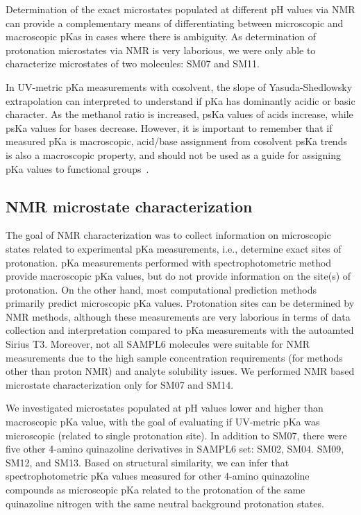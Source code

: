\documentclass[9pt,lineno]{elife}
\begin{document}
Determination of the exact microstates populated at different pH values via NMR can provide a complementary means of differentiating between microscopic and macroscopic pKas in cases where there is ambiguity.
As determination of protonation microstates via NMR is very laborious, we were only able to characterize microstates of two molecules: SM07 and SM11. 

In UV-metric pKa measurements with cosolvent, the slope of Yasuda-Shedlowsky extrapolation can interpreted to understand if pKa has dominantly acidic or basic character. 
As the methanol ratio is increased, psKa values of acids increase, while psKa values for bases decrease. 
However, it is important to remember that if measured pKa is macroscopic, acid/base assignment from cosolvent psKa trends is also a macroscopic property, and should not be used as a guide for assigning pKa values to functional groups~\citep{fraczkiewicz_silico_2013}.

\subsection{NMR microstate characterization}

The goal of NMR characterization was to collect information on microscopic states related to experimental pKa measurements, i.e., determine exact sites of protonation. 
pKa measurements performed with spectrophotometric method provide macroscopic pKa values, but do not provide information on the site(s) of protonation. 
On the other hand, most computational prediction methods primarily predict microscopic pKa values. 
Protonation sites can be determined by NMR methods, although these measurements are very laborious in terms of data collection and interpretation compared to pKa measurements with the autoamted Sirius T3. 
Moreover, not all SAMPL6 molecules were suitable for NMR measurements due to the high sample concentration requirements (for methods other than proton NMR) and analyte solubility issues. 
We performed NMR based microstate characterization only for SM07 and SM14. 

We investigated microstates populated at pH values lower and higher than macroscopic pKa value, with the goal of evaluating if UV-metric pKa was microscopic (related to single protonation site).
In addition to SM07, there were five other 4-amino quinazoline derivatives in SAMPL6 set: SM02, SM04. SM09, SM12, and SM13. 
Based on structural similarity, we can infer that spectrophotometric pKa values measured for other 4-amino quinazoline compounds as microscopic pKa related to the protonation of the same quinazoline nitrogen with the same neutral background protonation states.
\end{document}

